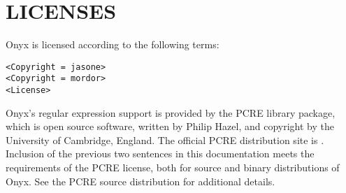 %
%
%
%
%

\clearemptydoublepage
\backmatter
\chapter{LICENSES}
%
%

Onyx is licensed according to the following terms:

\begin{verbatim}
<Copyright = jasone>
<Copyright = mordor>
<License>
\end{verbatim}

Onyx's regular expression support is provided by the PCRE library package, which
is open source software, written by Philip Hazel, and copyright by the
University of Cambridge, England.  The official PCRE distribution site is
.  Inclusion of
the previous two sentences in this documentation meets the requirements of the
PCRE license, both for source and binary distributions of Onyx.  See the PCRE
source distribution for additional details.

\clearemptydoublepage
%
%

\begin{theindex}
\printindex
\end{theindex}


